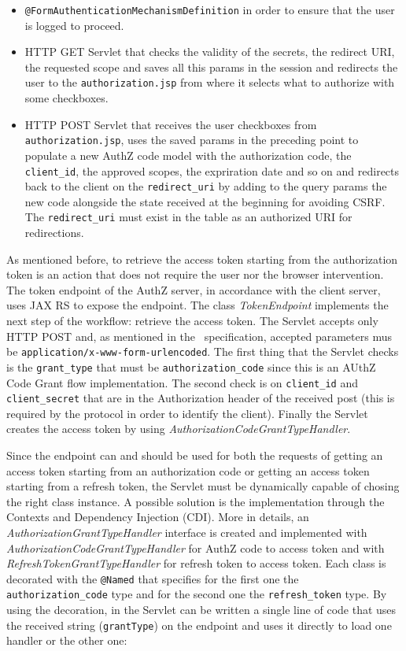 \begin{itemize}
    \item \texttt{@FormAuthenticationMechanismDefinition} in order to ensure that the user is logged to proceed.
    \item HTTP GET Servlet that checks the validity of the secrets, the redirect URI, the requested scope and saves all this params in the session and redirects the user to the \texttt{authorization.jsp} from where it selects what to authorize with some checkboxes.
    \item HTTP POST Servlet that receives the user checkboxes from \texttt{authorization.jsp}, uses the saved params in the preceding point to populate a new AuthZ code model with the authorization code, the \texttt{client\_id}, the approved scopes, the expriration date and so on and redirects back to the client on the \texttt{redirect\_uri} by adding to the query params the new code alongside the state received at the beginning for avoiding CSRF. The \texttt{redirect\_uri} must exist in the table as an authorized URI for redirections.
\end{itemize}

\noindent As mentioned before, to retrieve the access token starting from the authorization token is an action that does not require the user nor the browser intervention. The token endpoint of the AuthZ server, in accordance with the client server, uses JAX RS to expose the endpoint. The class \textit{TokenEndpoint} implements the next step of the workflow: retrieve the access token. The Servlet accepts only HTTP POST and, as mentioned in the \oauth\ specification, accepted parameters mus be \texttt{application/x-www-form-urlencoded}. The first thing that the Servlet checks is the \texttt{grant\_type} that must be \texttt{authorization\_code} since this is an AUthZ Code Grant flow implementation. The second check is on \texttt{client\_id} and \texttt{client\_secret} that are in the Authorization header of the received post (this is required by the protocol in order to identify the client). Finally the Servlet creates the access token by using \textit{AuthorizationCodeGrantTypeHandler}. 

Since the endpoint can and should be used for both the requests of getting an access token starting from an authorization code or getting an access token starting from a refresh token, the Servlet must be dynamically capable of chosing the right class instance. A possible solution is the implementation through the Contexts and Dependency Injection (CDI). More in details, an \textit{AuthorizationGrantTypeHandler} interface is created and implemented with \textit{AuthorizationCodeGrantTypeHandler} for AuthZ code to access token and with \textit{RefreshTokenGrantTypeHandler} for refresh token to access token. Each class is decorated with the \texttt{@Named} that specifies for the first one the \texttt{authorization\_code} type and for the second one the \texttt{refresh\_token} type. By using the decoration, in the Servlet can be written a single line of code that uses the received string (\texttt{grantType}) on the endpoint and uses it directly to load one handler or the other one:


